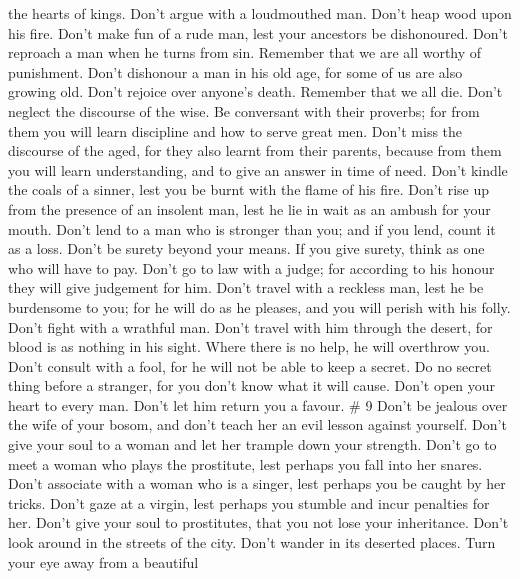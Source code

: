 the hearts of kings.  Don't argue with a loudmouthed man.
Don't heap wood upon his fire.  Don't make fun of a rude
man, lest your ancestors be dishonoured.  Don't reproach a
man when he turns from sin. Remember that we are all worthy of
punishment.  Don't dishonour a man in his old age, for some
of us are also growing old.  Don't rejoice over anyone's
death. Remember that we all die.  Don't neglect the
discourse of the wise. Be conversant with their proverbs; for from them
you will learn discipline and how to serve great men.  Don't
miss the discourse of the aged, for they also learnt from their parents,
because from them you will learn understanding, and to give an answer in
time of need.  Don't kindle the coals of a sinner, lest you
be burnt with the flame of his fire.  Don't rise up from
the presence of an insolent man, lest he lie in wait as an ambush for
your mouth.  Don't lend to a man who is stronger than you;
and if you lend, count it as a loss.  Don't be surety
beyond your means. If you give surety, think as one who will have to
pay.  Don't go to law with a judge; for according to his
honour they will give judgement for him.  Don't travel with
a reckless man, lest he be burdensome to you; for he will do as he
pleases, and you will perish with his folly.  Don't fight
with a wrathful man. Don't travel with him through the desert, for blood
is as nothing in his sight. Where there is no help, he will overthrow
you.  Don't consult with a fool, for he will not be able to
keep a secret.  Do no secret thing before a stranger, for
you don't know what it will cause.  Don't open your heart
to every man. Don't let him return you a favour. \# 9  Don't
be jealous over the wife of your bosom, and don't teach her an evil
lesson against yourself.  Don't give your soul to a woman
and let her trample down your strength.  Don't go to meet a
woman who plays the prostitute, lest perhaps you fall into her snares.
 Don't associate with a woman who is a singer, lest perhaps
you be caught by her tricks.  Don't gaze at a virgin, lest
perhaps you stumble and incur penalties for her.  Don't give
your soul to prostitutes, that you not lose your inheritance.
 Don't look around in the streets of the city. Don't wander
in its deserted places.  Turn your eye away from a beautiful

